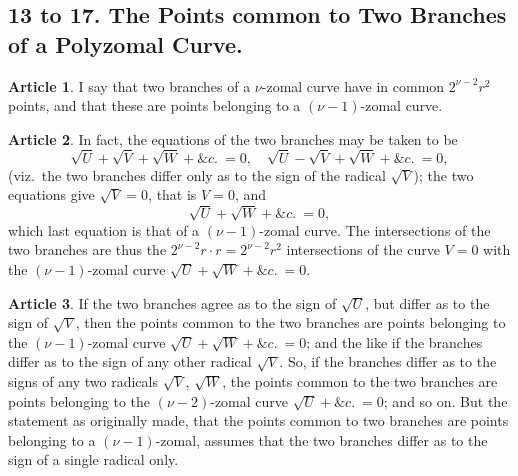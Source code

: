\documentclass[11pt,a4paper]{article}
\theoremstyle{definition}
\newtheorem{art}{Article}
\begin{document}
\subsection{13 to 17. The Points common to Two Branches of a Polyzomal Curve.}

\begin{art}
I say that two branches of a $\nu$-zomal curve have in common $2^{\nu-2}r^{2}$ points, and that these are points belonging to a $(\nu - 1)$-zomal curve.
\end{art}

\begin{art}
In fact, the equations of the two branches may be taken to be
\[
\sqrt{U} + \sqrt{V} + \sqrt{W} + \&c.\ = 0, \quad \sqrt{U} - \sqrt{V} + \sqrt{W} + \&c.\ = 0,
\]
(viz.\ the two branches differ only as to the sign of the radical $\sqrt{V}$); the two equations give $\sqrt{V} = 0$, that is $V = 0$, and
\[
\sqrt{U} + \sqrt{W} + \&c.\ = 0,
\]
which last equation is that of a $(\nu - 1)$-zomal curve. The intersections of the two branches are thus the $2^{\nu-2}r \cdot r = 2^{\nu-2}r^{2}$ intersections of the curve $V = 0$ with the $(\nu - 1)$-zomal curve $\sqrt{U} + \sqrt{W} + \&c.\ = 0$.
\end{art}

\begin{art}
If the two branches agree as to the sign of $\sqrt{U}$, but differ as to the sign of $\sqrt{V}$, then the points common to the two branches are points belonging to the $(\nu - 1)$-zomal curve $\sqrt{U} + \sqrt{W} + \&c.\ = 0$; and the like if the branches differ as to the sign of any other radical $\sqrt{V}$. So, if the branches differ as to the signs of any two radicals $\sqrt{V}$, $\sqrt{W}$, the points common to the two branches are points belonging to the $(\nu - 2)$-zomal curve $\sqrt{U} + \&c.\ = 0$; and so on. But the statement as originally made, that the points common to two branches are points belonging to a $(\nu - 1)$-zomal, assumes that the two branches differ as to the sign of a single radical only.
\end{art}
\end{document}
